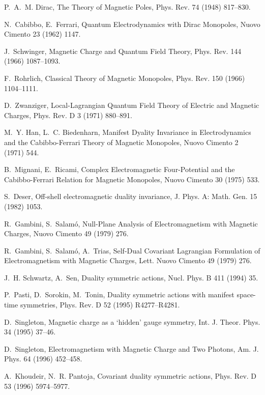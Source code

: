 \documentclass[1p,sort&compress]{elsarticle}
\numberwithin{equation}{section}
\begin{document}
\begin{thebibliography}{999}
P.~A.~M. Dirac, {The Theory of Magnetic Poles}, Phys. Rev. 74 (1948) 817--830.

N.~Cabibbo, E.~Ferrari, {Quantum Electrodynamics with Dirac Monopoles}, Nuovo
  Cimento 23 (1962) 1147.

J.~Schwinger, {Magnetic Charge and Quantum Field Theory}, Phys. Rev. 144 (1966)
  1087--1093.

F.~Rohrlich, {Classical Theory of Magnetic Monopoles}, Phys. Rev. 150 (1966)
  1104--1111.

D.~Zwanziger, {Local-Lagrangian Quantum Field Theory of Electric and Magnetic
  Charges}, Phys. Rev. D 3 (1971) 880--891.

M.~Y. Han, L.~C. Biedenharn, {Manifest Dyality Invariance in Electrodynamics
  and the Cabibbo-Ferrari Theory of Magnetic Monopoles}, Nuovo Cimento 2 (1971)
  544.

B.~Mignani, E.~Ricami, {Complex Electromagnetic Four-Potential and the
  Cabibbo-Ferrari Relation for Magnetic Monopoles}, Nuovo Cimento 30 (1975)
  533.

S.~Deser, {Off-shell electromagnetic duality invariance}, J. Phys. A: Math.
  Gen. 15 (1982) 1053.

R.~Gambini, S.~Salam\'o, {Null-Plane Analysis of Electromagnetism with Magnetic
  Charges}, Nuovo Cimento 49 (1979) 276.

R.~Gambini, S.~Salam\'o, A.~Trias, {Self-Dual Covariant Lagrangian Formulation
  of Electromagnetism with Magnetic Charges}, Lett. Nuovo Cimento 49 (1979)
  276.

J.~H. Schwartz, A.~Sen, {Duality symmetric actions}, Nucl. Phys. B 411 (1994)
  35.

P.~Pasti, D.~Sorokin, M.~Tonin, {Duality symmetric actions with manifest
  space-time symmetries}, Phys. Rev. D 52 (1995) R4277--R4281.

D.~Singleton, {Magnetic charge as a `hidden' gauge symmetry}, Int. J. Theor.
  Phys. 34 (1995) 37--46.

D.~Singleton, {Electromagnetism with Magnetic Charge and Two Photons}, Am. J.
  Phys. 64 (1996) 452--458.

A.~Khoudeir, N.~R. Pantoja, {Covariant duality symmetric actions}, Phys. Rev. D
  53 (1996) 5974--5977.


\end{thebibliography}
\end{document}
